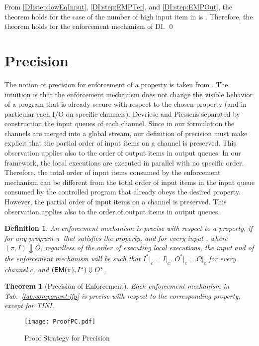 \documentclass[10pt,a4paper,oneside]{article}
\newtheorem{definition}{Definition}[section]
\newtheorem{theorem}{Theorem}[section]
\def\execution#1#2#3{\ensuremath{(#1, #2)\Downarrow#3}}
\def\channeleq#1#2#3{\ensuremath{\restrict{#1}{#3} = \restrict{#2}{#3}}}
\def\restrict#1#2{\ensuremath{{#1}|_{#2}}}
\def\chnl{\ensuremath{c}}
\def\sanserif#1{\ensuremath{\sf #1}}
\def\EM{\ensuremath{{\sanserif{EM}}}}
\def\Prog{\ensuremath{\pi}}
\def\EMP{\ensuremath{\EM(}\ensuremath{\Prog)}}
\begin{document}
From \ref{DI:step:lowEqInput}, \ref{DI:step:EMPTer}, and \ref{DI:step:EMPOut}, the theorem holds for the case of the number of high input item in  is . Therefore, the theorem holds for the enforcement mechanism of DI. \qed

\section{Precision} \label{sec:precision}
The notion of precision for enforcement of a property is taken from \cite{Devr-Pies-10-IEEESP,DeGroef-etal-12-CCS}. The intuition is that the enforcement mechanism does not change the visible behavior of a program that is already secure with respect to the chosen property (and in particular each I/O on specific channels). Devriese and Piessens separated by construction the input queues of each channel. Since in our formulation the channels are merged into a global stream, our definition of precision must make explicit that the partial order of input items on a channel is preserved. This observation applies also to the order of output items in output queues. In our framework, the local executions are executed in parallel with no specific order. Therefore, the total order of input items consumed by the enforcement mechanism can be different from  the total order of input items in the input queue consumed by the controlled program that already obeys the desired property. However, the partial order of input items on a channel is preserved. This observation applies also to the order of output items in output queues.

\begin{definition}\label{def:precision}
An enforcement mechanism is \emph{precise} with respect to a property, if for any program \Prog\ that satisfies the property, and for every input , where \execution{\Prog}{I}{O}, regardless of the order of executing local executions, the input  and  of the enforcement mechanism will be such that \channeleq{I^*}{I}{\chnl}, \channeleq{O^*}{O}{\chnl} for every channel \chnl, and \execution{\EMP}{I^*}{O^*}.
\end{definition}


\begin{theorem}[Precision of Enforcement] \label{thm:precision}
	Each enforcement mechanism in Tab.~\ref{tab:component:ifp} is precise with respect to the corresponding property, except for TINI.
\end{theorem}

\begin{figure}
\centering
\texttt{[image: ProofPC.pdf]}
\caption{Proof Strategy for Precision}
\label{fig:proof:PC}
\end{figure}
\end{document}
